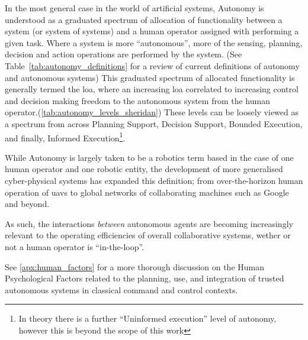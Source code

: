 In the most general case in the world of artificial systems, Autonomy is understood as a graduated spectrum of allocation of functionality between a system (or system of systems) and a human operator assigned with performing a given task. 
Where a system is more ``autonomous'', more of the sensing, planning, decision and action operations are performed by the system. (See Table~\ref{tab:autonomy_definitions} for a review of current definitions of autonomy and autonomous systems)
This graduated spectrum of allocated functionality is generally termed the \gls{loa}, where an increasing \gls{loa} correlated to increasing control and decision making freedom to the autonomous system from the human operator.(\autoref{tab:autonomy_levels_sheridan})
These levels can be loosely viewed as a spectrum from across Planning Support, Decision Support, Bounded Execution, and finally, Informed Execution\footnote{In theory there is a further ``Uninformed execution'' level of autonomy, however this is beyond the scope of this work\cite{Cameron1984}}.

While Autonomy is largely taken to be a robotics term based in the case of one human operator and one robotic entity, the development of more generalised cyber-physical systems has expanded this definition; from over-the-horizon human operation of \glspl{uav} to global networks of collaborating machines such as Google and beyond.

As such, the interactions \emph{between} autonomous agents are becoming increasingly relevant to the operating efficiencies of overall collaborative systems, wether or not a human operator is ``in-the-loop''.

See \autoref{apx:human_factors} for a more thorough discussion on the Human Psychological Factors related to the planning, use, and integration of trusted autonomous systems in classical command and control contexts.


